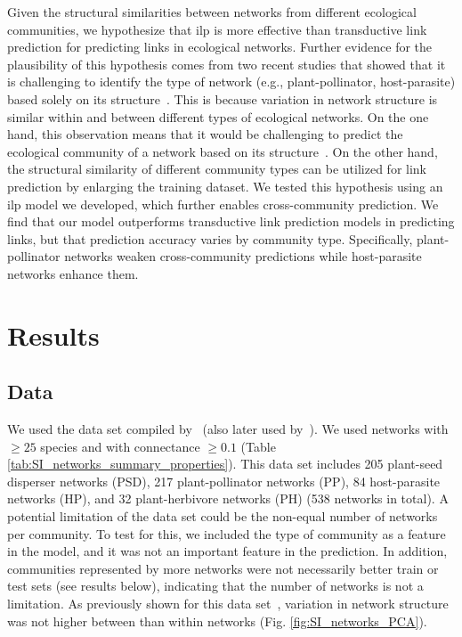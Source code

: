 \documentclass[oneside, a4paper, onecolumn, 11pt]{article}
\begin{document}
\begin{refsection}
Given the structural similarities between networks from different ecological communities, we hypothesize that \ac{ilp} is more effective than transductive link prediction for predicting links in ecological networks. Further evidence for the plausibility of this hypothesis comes from two recent studies that showed that it is challenging to identify the type of network (e.g., plant-pollinator, host-parasite) based solely on its structure~\autocite{Michalska-Smith2019-ap,Brimacombe2023-fk}. This is because variation in network structure is similar within and between different types of ecological networks. On the one hand, this observation means that it would be challenging to predict the ecological community of a network based on its structure~\autocite{Michalska-Smith2019-ap}. On the other hand, the structural similarity of different community types can be utilized for link prediction by enlarging the training dataset. We tested this hypothesis using an \ac{ilp} model we developed, which further enables cross-community prediction. We find that our model outperforms transductive link prediction models in predicting links, but that prediction accuracy varies by community type. Specifically, plant-pollinator networks weaken cross-community predictions while host-parasite networks enhance them.

\section*{Results}

\subsection*{Data}\label{sec:Methods}

We used the data set compiled by~\autocite{Michalska-Smith2019-ap} (also later used by~\autocite{Brimacombe2023-fk}). We used networks with $\geq25$ species and with connectance $\geq0.1$ (Table \ref{tab:SI_networks_summary_properties}). This data set includes 205 plant-seed disperser networks (PSD), 217 plant-pollinator networks (PP), 84 host-parasite networks (HP), and 32 plant-herbivore networks (PH) (538 networks in total). A potential limitation of the data set could be the non-equal number of networks per community. To test for this, we included the type of community as a feature in the model, and it was not an important feature in the prediction. In addition, communities represented by more networks were not necessarily better train or test sets (see results below), indicating that the number of networks is not a limitation. As previously shown for this data set~\autocite{Michalska-Smith2019-ap,Brimacombe2023-fk}, variation in network structure was not higher between than within networks (Fig. \ref{fig:SI_networks_PCA}). 


\end{refsection}
\end{document}
